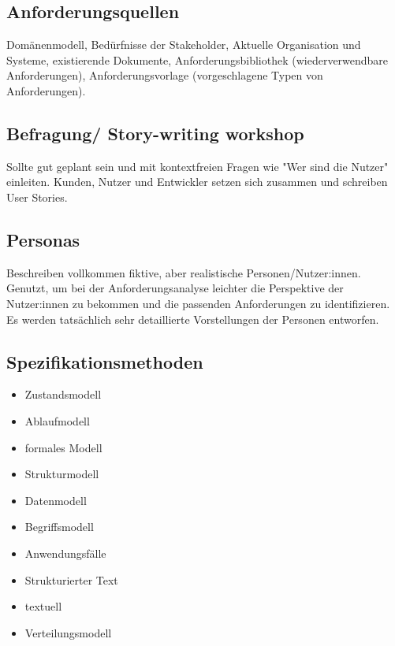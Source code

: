 \documentclass{book}
\begin{document}
    \subsection{Anforderungsquellen}
    Domänenmodell, Bedürfnisse der Stakeholder, Aktuelle Organisation und Systeme, existierende Dokumente, Anforderungsbibliothek (wiederverwendbare Anforderungen), Anforderungsvorlage (vorgeschlagene Typen von Anforderungen).

    \subsection{Befragung/ Story-writing workshop}
    Sollte gut geplant sein und mit kontextfreien Fragen wie "Wer sind die Nutzer" einleiten.
    Kunden, Nutzer und Entwickler setzen sich zusammen und schreiben User Stories.

    \subsection{Personas}
    Beschreiben vollkommen fiktive, aber realistische Personen/Nutzer:innen. Genutzt, um bei der Anforderungsanalyse leichter die Perspektive der Nutzer:innen zu bekommen und die passenden Anforderungen zu identifizieren. Es werden tatsächlich sehr detaillierte Vorstellungen der Personen entworfen.

    \subsection{Spezifikationsmethoden}
    \begin{itemize}
        \item Zustandsmodell
        \item Ablaufmodell
        \item formales Modell
        \item Strukturmodell
        \item Datenmodell
        \item Begriffsmodell
        \item Anwendungsfälle
        \item Strukturierter Text
        \item textuell
        \item Verteilungsmodell
    \end{itemize}
\end{document}
